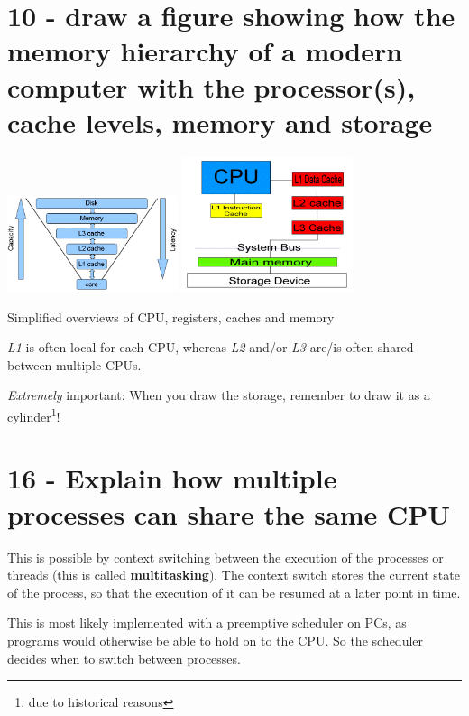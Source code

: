 \documentclass{article}
\begin{document}
\section*{10 - draw a figure showing how the memory hierarchy of a modern computer with the processor(s), cache levels, memory and storage}

\begin{center}
\includegraphics[width=5.0cm]{images/cpu_cache_structure.png}
\includegraphics[width=5.0cm]{images/CPU-Cache-System.png}



Simplified overviews of CPU, registers, caches and memory
\end{center}

\emph{L1} is often local for each CPU, whereas \emph{L2} and/or \emph{L3} are/is often shared between multiple CPUs.

\emph{Extremely} important: When you draw the storage, remember to draw it as a cylinder\footnote{due to historical reasons}!


\section*{16 - Explain how multiple processes can share the same CPU}
This is possible by context switching between the execution of the processes or threads (this is called \textbf{multitasking}). The context switch stores the current state of the process, so that the execution of it can be resumed at a later point in time.




This is most likely implemented with a preemptive scheduler on PCs, as programs would otherwise be able to hold on to the CPU. So the scheduler decides when to switch between processes.
\end{document}
